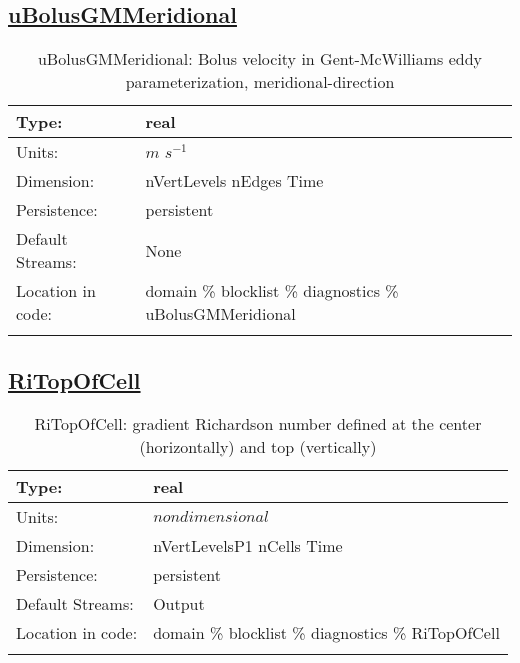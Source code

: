 \subsection[uBolusGMMeridional]{\hyperref[sec:var_tab_diagnostics]{uBolusGMMeridional}}
\label{subsec:var_sec_diagnostics_uBolusGMMeridional}
\begin{center}
\begin{longtable}{| p{2.0in} | p{4.0in} |}
        \hline 
        Type: & real \\
        \hline 
        Units: & $m$ $s^{-1}$ \\
        \hline 
        Dimension: & nVertLevels nEdges Time \\
        \hline 
        Persistence: & persistent \\
        \hline 
		 Default Streams: & None \\
        \hline 
		 Location in code: & domain \% blocklist \% diagnostics \% uBolusGMMeridional \\
		 \hline 
    \caption{uBolusGMMeridional: Bolus velocity in Gent-McWilliams eddy parameterization, meridional-direction}
\end{longtable}
\end{center}
\subsection[RiTopOfCell]{\hyperref[sec:var_tab_diagnostics]{RiTopOfCell}}
\label{subsec:var_sec_diagnostics_RiTopOfCell}
\begin{center}
\begin{longtable}{| p{2.0in} | p{4.0in} |}
        \hline 
        Type: & real \\
        \hline 
        Units: & $nondimensional$ \\
        \hline 
        Dimension: & nVertLevelsP1 nCells Time \\
        \hline 
        Persistence: & persistent \\
        \hline 
		 Default Streams: & Output  \\
        \hline 
		 Location in code: & domain \% blocklist \% diagnostics \% RiTopOfCell \\
		 \hline 
    \caption{RiTopOfCell: gradient Richardson number defined at the center (horizontally) and top (vertically)}
\end{longtable}
\end{center}
